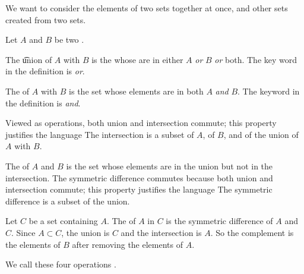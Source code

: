 
\sbasic



















\sstart
{}


We want to consider the elements of two sets
together at once, and other sets created
from two sets.


Let $A$ and $B$ be two .

The \t{union} of $A$ with $B$ is the
 whose  are
in either $A$ \textit{or} $B$ \textit{or} both.
The key word in the definition is \textit{or}.

The  of $A$ with $B$ is
the set whose elements are in both $A$ \textit{and} $B$.
The keyword in the definition is \textit{and}.

Viewed as operations, both union and intersection commute;
this property justifies the language 
The intersection is a subset of $A$, of $B$,
and of the union of $A$ with $B$.

The 
of $A$ and $B$ is the set whose elements are in the union
but not in the intersection.
The symmetric difference commutes because both union and
intersection commute; this property justifies the
language 
The symmetric difference is a subset of the union.


Let $C$ be a set containing $A$.
The  of $A$ in $C$ is
the symmetric difference of $A$ and $C$.
Since $A \subset C$, the union is $C$ and the
intersection is $A$.
So the complement is the  elements of $B$ after removing the elements of $A$.

We call these four operations
.



